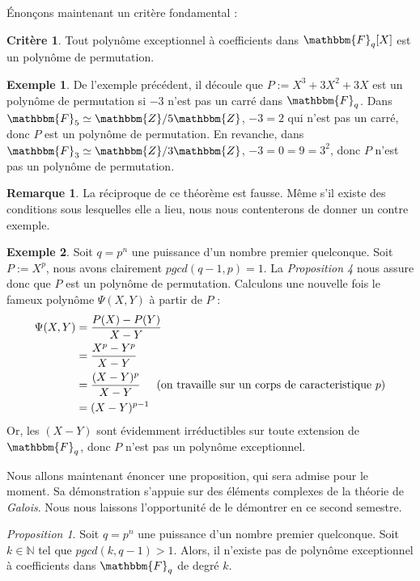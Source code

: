 \documentclass[12pt]{article}
\theoremstyle{remark}\newtheorem{note}{Note}
\theoremstyle{remark}\newtheorem{nota}{Notation}
\newcommand{\Fq}{\mathbbm{F}_q}
\newtheorem{prop}{Proposition}
\theoremstyle{definition}
\newtheorem{example}{Exemple}
\newtheorem{rem}{Remarque}
\newtheorem{crit}{Critère}
\begin{document}
Énonçons maintenant un critère fondamental :

\begin{crit}
Tout polynôme exceptionnel à coefficients dans $\Fq[X]$ est un polynôme de permutation.
\end{crit}

\begin{example}
De l'exemple précédent, il découle que $P := X^3 +3X^2 + 3X$ est un polynôme de permutation si $-3$ n'est pas un carré dans $\Fq$. \newline
Dans $\mathbbm{F}_5 \simeq \mathbbm{Z}/5\mathbbm{Z}$, $-3 = 2$ qui n'est pas un carré, donc $P$ est un polynôme de permutation. En revanche, dans $\mathbbm{F}_3 \simeq \mathbbm{Z}/ 3\mathbbm{Z}$, $-3 = 0 = 9 = 3^2$, donc $P$ n'est pas un polynôme de permutation.
\end{example}

\begin{rem}
La réciproque de ce théorème est fausse. Même s'il existe des conditions sous lesquelles elle a lieu, nous nous contenterons de donner un contre exemple.
\end{rem}

\begin{example}
Soit $q = p^n$ une puissance d'un nombre premier quelconque. Soit $P := X^p$, nous avons clairement $pgcd(q-1, p) = 1$. La \textit{Proposition 4} nous assure donc que $P$ est un polynôme de permutation. Calculons une nouvelle fois le fameux polynôme $\Psi(X,Y)$ à partir de $P$ :
	\begin{align*}
\Psi(X,Y) &= \displaystyle\frac{P(X) - P(Y)}{X-Y} \\
&= \displaystyle\frac{X^p - Y^p}{X-Y} \\
&= \displaystyle\frac{(X-Y)^p}{X-Y} \hspace{0,5cm} \text{(on travaille sur un corps de caracteristique $p$)} \\
&= (X-Y)^{p-1}
	\end{align*}
Or, les $(X-Y)$ sont évidemment irréductibles sur toute extension de $\Fq$, donc $P$ n'est pas un polynôme exceptionnel.
\end{example}
Nous allons maintenant énoncer une proposition, qui sera admise pour le moment. Sa démonstration s'appuie sur des éléments complexes de la théorie de \textit{Galois}. Nous nous laissons l'opportunité de le démontrer en ce second semestre.

\begin{prop}
Soit $q = p^n$ une puissance d'un nombre premier quelconque. Soit $k \in \mathds{N}$ tel que $pgcd(k, q-1) > 1$. Alors, il n'existe pas de polynôme exceptionnel à coefficients dans $\Fq$ de degré $k$.
\end{prop}
\end{document}
